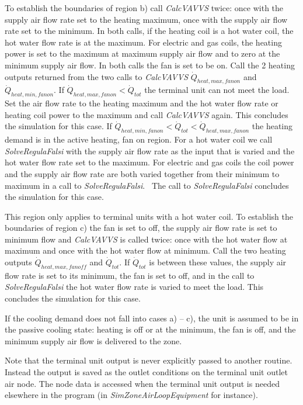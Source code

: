 To establish the boundaries of region b) call \emph{CalcVAVVS} twice: once with the supply air flow rate set to the heating maximum, once with the supply air flow rate set to the minimum. In both calls, if the heating coil is a hot water coil, the hot water flow rate is at the maximum. For electric and gas coils, the heating power is set to the maximum at maximum supply air flow and to zero at the minimum supply air flow. In both calls the fan is set to be on. Call the 2 heating outputs returned from the two calls to \emph{CalcVAVVS} \({\dot Q_{heat,max,fanon}}\) and \({\dot Q_{heat,min,fanon}}\). If \({\dot Q_{heat,max,fanon}} < {\dot Q_{tot}}\) the terminal unit can not meet the load. Set the air flow rate to the heating maximum and the hot water flow rate or heating coil power to the maximum and call \emph{CalcVAVVS} again. This concludes the simulation for this case. If \({\dot Q_{heat,min,fanon}} < {\dot Q_{tot}} < {\dot Q_{heat,max,fanon}}\) the heating demand is in the active heating, fan on region. For a hot water coil we call \emph{SolveRegulaFalsi} with the supply air flow rate as the input that is varied and the hot water flow rate set to the maximum. For electric and gas coils the coil power and the supply air flow rate are both varied together from their minimum to maximum in a call to \emph{SolveRegulaFalsi}.~ The call to \emph{SolveRegulaFalsi} concludes the simulation for this case.

This region only applies to terminal units with a hot water coil. To establish the boundaries of region c) the fan is set to off, the supply air flow rate is set to minimum flow and \emph{CalcVAVVS} is called twice: once with the hot water flow at maximum and once with the hot water flow at minimum. Call the two heating outputs \({\dot Q_{heat,max,fanoff}}\) and \({\dot Q_{tot}}\). If \({\dot Q_{tot}}\) is between these values, the supply air flow rate is set to its minimum, the fan is set to off, and in the call to \emph{SolveRegulaFalsi} the hot water flow rate is varied to meet the load. This concludes the simulation for this case.

If the cooling demand does not fall into cases a) -- c), the unit is assumed to be in the passive cooling state: heating is off or at the minimum, the fan is off, and the minimum supply air flow is delivered to the zone.

Note that the terminal unit output is never explicitly passed to another routine. Instead the output is saved as the outlet conditions on the terminal unit outlet air node. The node data is accessed when the terminal unit output is needed elsewhere in the program (in \emph{SimZoneAirLoopEquipment} for instance).

